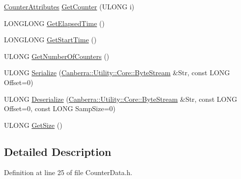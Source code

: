 \begin{DoxyCompactItemize}
\hyperlink{struct_canberra_1_1_data_types_1_1_spectroscopy_1_1_counter_attributes_tag}{Counter\+Attributes} \hyperlink{class_canberra_1_1_data_types_1_1_spectroscopy_1_1_counter_data_1_1_sample_a52b3e23bbeaac3d5e94a26b718bdad0c_a52b3e23bbeaac3d5e94a26b718bdad0c}{Get\+Counter} (U\+L\+O\+NG i)
\item 
L\+O\+N\+G\+L\+O\+NG \hyperlink{class_canberra_1_1_data_types_1_1_spectroscopy_1_1_counter_data_1_1_sample_a04ef8803ed612b367f9fb472cd06c360_a04ef8803ed612b367f9fb472cd06c360}{Get\+Elapsed\+Time} ()
\item 
L\+O\+N\+G\+L\+O\+NG \hyperlink{class_canberra_1_1_data_types_1_1_spectroscopy_1_1_counter_data_1_1_sample_a789d176e8a846ea105ce9af768041200_a789d176e8a846ea105ce9af768041200}{Get\+Start\+Time} ()
\item 
U\+L\+O\+NG \hyperlink{class_canberra_1_1_data_types_1_1_spectroscopy_1_1_counter_data_1_1_sample_a93a4f058a79941d8546ec97614194aca_a93a4f058a79941d8546ec97614194aca}{Get\+Number\+Of\+Counters} ()
\item 
U\+L\+O\+NG \hyperlink{class_canberra_1_1_data_types_1_1_spectroscopy_1_1_counter_data_1_1_sample_a74f6e5a66324cf9916a5e78ecfdb8f3e_a74f6e5a66324cf9916a5e78ecfdb8f3e}{Serialize} (\hyperlink{class_canberra_1_1_utility_1_1_core_1_1_byte_stream}{Canberra\+::\+Utility\+::\+Core\+::\+Byte\+Stream} \&Str, const L\+O\+NG Offset=0)
\item 
U\+L\+O\+NG \hyperlink{class_canberra_1_1_data_types_1_1_spectroscopy_1_1_counter_data_1_1_sample_a1cb5b59be53e4325ac3a39cd1a7289d2_a1cb5b59be53e4325ac3a39cd1a7289d2}{Deserialize} (\hyperlink{class_canberra_1_1_utility_1_1_core_1_1_byte_stream}{Canberra\+::\+Utility\+::\+Core\+::\+Byte\+Stream} \&Str, const L\+O\+NG Offset=0, const L\+O\+NG Samp\+Size=0)
\item 
U\+L\+O\+NG \hyperlink{class_canberra_1_1_data_types_1_1_spectroscopy_1_1_counter_data_1_1_sample_a490cfe089ff59c8660059fc330b24354_a490cfe089ff59c8660059fc330b24354}{Get\+Size} ()
\end{DoxyCompactItemize}


\subsection{Detailed Description}


Definition at line 25 of file Counter\+Data.\+h.



